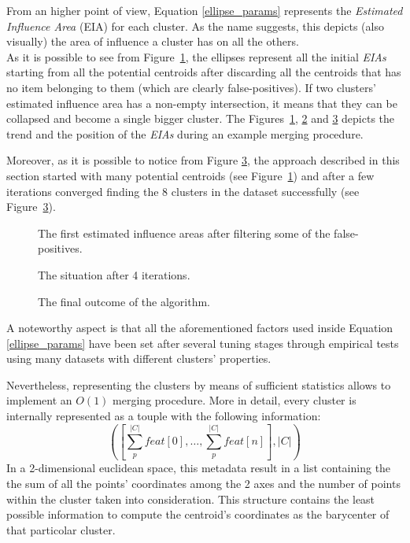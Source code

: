 From an higher point of view, Equation \ref{ellipse_params} represents the \emph{Estimated Influence Area}
(EIA) for each cluster. As the name suggests, this depicts (also visually) the area of influence a
cluster has on all the others.\\
As it is possible to see from Figure~\ref{start}, the ellipses represent all the initial
\emph{EIAs} starting from all the potential centroids after discarding
all the centroids that has no item belonging to them (which are clearly false-positives).
If two clusters' estimated influence area has a non-empty intersection, it
means that they can be collapsed and become a single bigger cluster.
The Figures~\ref{start}, \ref{middle} and \ref{end} depicts the trend and the position of the
\emph{EIAs} during an example merging procedure.

Moreover, as it is possible to notice from Figure \ref{end}, the approach described in this
section started with many potential centroids (see Figure~\ref{start}) and after a
few iterations converged finding the 8 clusters in the dataset successfully
(see Figure~\ref{end}).

\begin{figure}[t]
  \caption{The first estimated influence areas after filtering some of the false-positives.}
  \label{start}
\end{figure}

\begin{figure}[t]
  \caption{The situation after 4 iterations.}
  \label{middle}
\end{figure}

\begin{figure}[t]
  \caption{The final outcome of the algorithm.}
  \label{end}
\end{figure}

A noteworthy aspect is that all the aforementioned factors used inside Equation \ref{ellipse_params} have
been set after several tuning stages through empirical tests using many datasets with different
clusters' properties.

Nevertheless, representing the clusters by means of sufficient statistics allows to implement an $O(1)$
merging procedure. More in detail, every cluster is internally represented as a touple with the
following information:
\begin{equation*}
    \left(\left[\sum_{p}^{|C|} feat[0],\dots,\sum_{p}^{|C|} feat[n]\right],|C|\right)
\end{equation*}
In a 2-dimensional euclidean space, this metadata result in a list containing the the sum of all the
points' coordinates among the 2 axes and the number of points within the cluster taken into consideration.
This structure contains the least possible information to compute the centroid's coordinates as the
barycenter of that particolar cluster.

